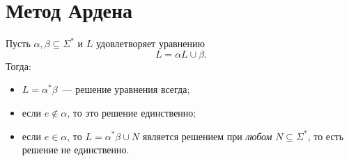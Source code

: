 \documentclass[12pt]{article}
\begin{document}
	\section{Метод Ардена}
	
	\begin{lemma}
		Пусть $\alpha, \beta \subseteq \Sigma^*$ и $L$ удовлетворяет уравнению
		\[
		L = \alpha L \cup \beta.
		\]
		Тогда:
		\begin{itemize}
			\item $L = \alpha^* \beta$~--- решение уравнения всегда;
			\item если $e \notin \alpha$, то это решение единственно;
			\item если $e \in \alpha$, то $L = \alpha^*\beta \cup N$ является решением при \emph{любом} $N \subseteq \Sigma^*$, то есть решение не единственно.
		\end{itemize}
	\end{lemma}
	
\end{document}
